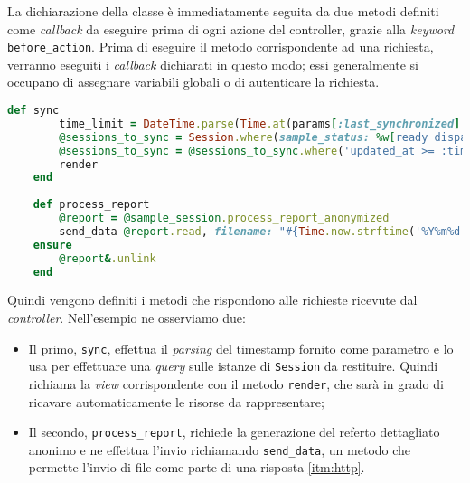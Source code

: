 La dichiarazione della classe è immediatamente seguita da due metodi definiti come \textit{callback} da eseguire prima di ogni azione del controller, grazie alla \textit{keyword} \texttt{before\_action}. Prima di eseguire il metodo corrispondente ad una richiesta, verranno eseguiti i \textit{callback} dichiarati in questo modo; essi generalmente si occupano di assegnare variabili globali o di autenticare la richiesta.
\begin{lstlisting}[caption={\textbf{\texttt{sample\_session\_controller.rb}}},captionpos=b,language=Ruby]
    def sync
        time_limit = DateTime.parse(Time.at(params[:last_synchronized].to_i).to_s)
        @sessions_to_sync = Session.where(sample_status: %w[ready dispatched analysed under_review final])
        @sessions_to_sync = @sessions_to_sync.where('updated_at >= :time_limit', time_limit: time_limit)
        render
    end
  
    def process_report
        @report = @sample_session.process_report_anonymized
        send_data @report.read, filename: "#{Time.now.strftime('%Y%m%d')}_#{params[:sample_code]}.pdf", type: 'application/pdf'
    ensure
        @report&.unlink
    end
\end{lstlisting}
Quindi vengono definiti i metodi che rispondono alle richieste ricevute dal \textit{controller}. Nell'esempio ne osserviamo due: 
\begin{itemize}
    \item Il primo, \texttt{sync}, effettua il \textit{parsing} del timestamp fornito come parametro e lo usa per effettuare una \textit{query} sulle istanze di \texttt{Session} da restituire. Quindi richiama la \textit{view} corrispondente con il metodo \texttt{render}, che sarà in grado di ricavare automaticamente le risorse da rappresentare;
    \item Il secondo, \texttt{process\_report}, richiede la generazione del referto dettagliato anonimo e ne effettua l'invio richiamando \texttt{send\_data}, un metodo che permette l'invio di file come parte di una risposta \ref{itm:http}.
\end{itemize} 

